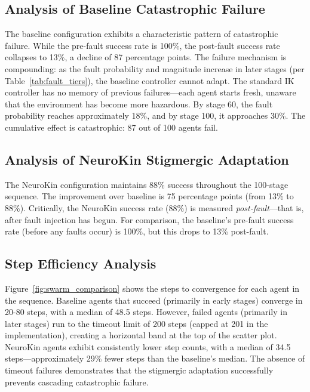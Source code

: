 \documentclass[12pt,a4paper,oneside]{report}
\begin{document}
\subsection{Analysis of Baseline Catastrophic Failure}

The baseline configuration exhibits a characteristic pattern of catastrophic failure. While the pre-fault success rate is 100\%, the post-fault success rate collapses to 13\%, a decline of 87 percentage points. The failure mechanism is compounding: as the fault probability and magnitude increase in later stages (per Table~\ref{tab:fault_tiers}), the baseline controller cannot adapt. The standard IK controller has no memory of previous failures---each agent starts fresh, unaware that the environment has become more hazardous. By stage 60, the fault probability reaches approximately 18\%, and by stage 100, it approaches 30\%. The cumulative effect is catastrophic: 87 out of 100 agents fail.

\subsection{Analysis of NeuroKin Stigmergic Adaptation}

The NeuroKin configuration maintains 88\% success throughout the 100-stage sequence. The improvement over baseline is 75 percentage points (from 13\% to 88\%). Critically, the NeuroKin success rate (88\%) is measured \textit{post-fault}---that is, after fault injection has begun. For comparison, the baseline's pre-fault success rate (before any faults occur) is 100\%, but this drops to 13\% post-fault.

\subsection{Step Efficiency Analysis}

Figure~\ref{fig:swarm_comparison} shows the steps to convergence for each agent in the sequence. Baseline agents that succeed (primarily in early stages) converge in 20-80 steps, with a median of 48.5 steps. However, failed agents (primarily in later stages) run to the timeout limit of 200 steps (capped at 201 in the implementation), creating a horizontal band at the top of the scatter plot. NeuroKin agents exhibit consistently lower step counts, with a median of 34.5 steps---approximately 29\% fewer steps than the baseline's median. The absence of timeout failures demonstrates that the stigmergic adaptation successfully prevents cascading catastrophic failure.
\end{document}
